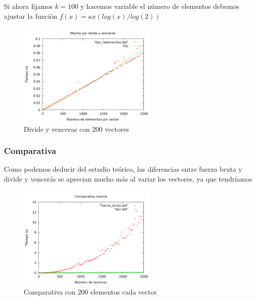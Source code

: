 Si ahora fijamos $k=100$ y hacemos variable el n\'umero de elementos debemos ajustar la funci\'on $f(x) = ax(log(x)/log(2))$

\begin{center}
\end{center}

\begin{figure}[htb] 
\centering
	\includegraphics[width=0.6\textwidth]{../Obligatorio/Graficas/dyv_nelementos.png}
	\caption{Divide y venceras con 200 vectores} 
	\label{fig:d_nelementos} 
\end{figure}
\newpage

\subsubsection{Comparativa}
Como podemos deducir del estudio te\'orico, las diferencias entre fuerza bruta y divide y vencer\'as se aprecian mucho m\'as al variar los vectores, ya que tendr\'iamos 
\begin{figure}[htb] 
\centering
	\includegraphics[width=0.6\textwidth]{../Obligatorio/Graficas/comparativa_kvectores.png}
	\caption{Comparativa con 200 elementos cada vector} 
	\label{fig:comp_kvectores} 
\end{figure}


